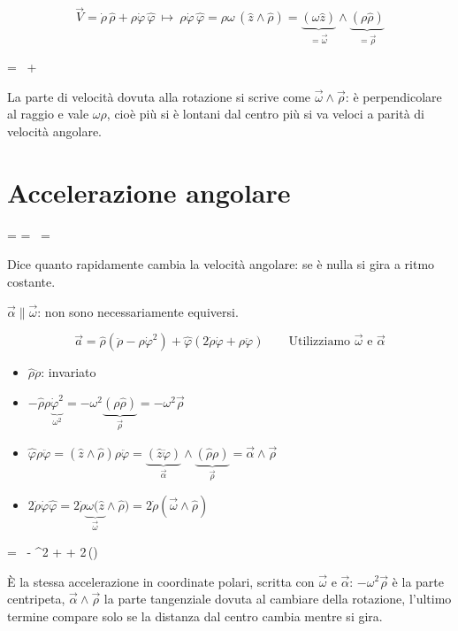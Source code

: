 \documentclass[11pt,a4paper,openany]{report}
\begin{document}
\[
  \vec{V} = \dot{\rho}\,\hat{\rho} + \rho\dot{\varphi}\,\hat{\varphi}
  \ \longmapsto\
  \rho\dot{\varphi}\,\hat{\varphi} = \rho\omega\,(\hat{z}\wedge\hat{\rho})
  = \underbrace{(\omega\hat{z})}_{= \vec{\omega}}\wedge\underbrace{(\rho\hat{\rho})}_{= \vec{\rho}}
\]
\begin{formula}
 = \dot{\rho}\,\hat{\rho} + \vec{\omega}\wedge\vec{\rho}
\end{formula}
\begin{significato}
La parte di velocità dovuta alla rotazione si scrive come $\vec{\omega}\wedge\vec{\rho}$:
è perpendicolare al raggio e vale $\omega\rho$, cioè più si è lontani dal centro più si va veloci
a parità di velocità angolare.
\end{significato}

\section{Accelerazione angolare}
\begin{formula}
\vec{\alpha} = \frac{d\vec{\omega}}{dt} = \dot{\omega}\,\hat{z} = \ddot{\varphi}\,\hat{z}
\end{formula}
\begin{significato}
Dice quanto rapidamente cambia la velocità angolare: se è nulla si gira a ritmo costante.
\end{significato}
$\vec{\alpha} \parallel \vec{\omega}$: non sono necessariamente equiversi.

\[
  \vec{a} = \hat{\rho}\left(\ddot{\rho} - \rho\dot{\varphi}^2\right) + \hat{\varphi}\left(2\dot{\rho}\dot{\varphi} + \rho\ddot{\varphi}\right)
  \qquad \text{Utilizziamo } \vec{\omega} \text{ e } \vec{\alpha}
\]
\begin{itemize}[nosep]
  \item $\hat{\rho}\ddot{\rho}$: invariato
  \item $-\hat{\rho}\rho\underbrace{\dot{\varphi}^2}_{\omega^2} = -\omega^2\underbrace{(\rho\hat{\rho})}_{\vec{\rho}} = -\omega^2\vec{\rho}$
  \item $\hat{\varphi}\rho\ddot{\varphi} = (\wedge\hat{\rho})\rho\ddot{\varphi}
         = \underbrace{(\ddot{\varphi})}_{\vec{\alpha}}\wedge\underbrace{(\hat{\rho}\rho)}_{\vec{\rho}} = \vec{\alpha}\wedge\vec{\rho}$
  \item $2\dot{\rho}\dot{\varphi}\hat{\varphi} = 2\dot{\rho}\underbrace{\omega(\hat{z}}_{\vec{\omega}}\wedge\hat{\rho}) = 2\dot{\rho}(\vec{\omega}\wedge\hat{\rho})$
\end{itemize}
\begin{formula}
 = \hat{\rho}\,\ddot{\rho} - \omega^2\vec{\rho} + \vec{\alpha}\wedge\vec{\rho} + 2\dot{\rho}\,(\vec{\omega}\wedge\vec{\rho})
\end{formula}
\begin{significato}
È la stessa accelerazione in coordinate polari, scritta con $\vec{\omega}$ e $\vec{\alpha}$:
$-\omega^2\vec{\rho}$ è la parte centripeta, $\vec{\alpha}\wedge\vec{\rho}$ la parte tangenziale dovuta
al cambiare della rotazione, l'ultimo termine compare solo se la distanza dal centro cambia mentre si gira.
\end{significato}
\end{document}
